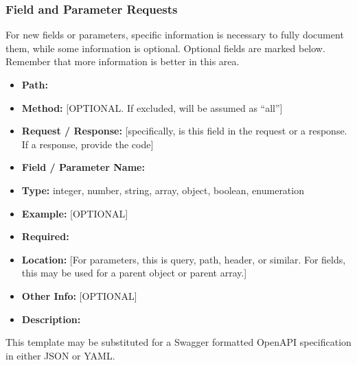 \documentclass[a4paper]{article}
\begin{document}
\subsubsection*{Field and Parameter Requests}
For new fields or parameters, specific information is necessary to fully document them, while some information is optional. Optional fields are marked below. Remember that more information is better in this area.
\begin{itemize}
	\item \textbf{Path:} 
	\item \textbf{Method:} [OPTIONAL. If excluded, will be assumed as ``all'']
	\item \textbf{Request / Response:} [specifically, is this field in the request or a response. If a response, provide the code]
	\item \textbf{Field / Parameter Name:} 
	\item \textbf{Type:} {integer}, {\ttfamily number}, {\ttfamily string}, {\ttfamily array}, {\ttfamily object}, {\ttfamily boolean}, {\ttfamily enumeration}
	\item \textbf{Example:} [OPTIONAL]
	\item \textbf{Required:} 
	\item \textbf{Location:} [For parameters, this is {\ttfamily query}, {\ttfamily path}, {\ttfamily header}, or similar. For fields, this may be used for a parent object or parent array.]
	\item \textbf{Other Info:} [OPTIONAL]
	\item \textbf{Description:} 
\end{itemize}
This template may be substituted for a Swagger formatted OpenAPI specification in either {\ttfamily JSON} or {\ttfamily YAML}.

\clearpage
\end{document}
